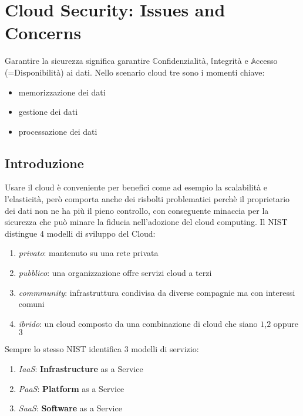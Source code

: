
\chapter{Cloud Security: Issues and Concerns}

Garantire la sicurezza significa garantire $\mathbb{C}$onfidenzialità, $\mathbb{I}$ntegrità e $\mathbb{A}$ccesso (=Disponibilità) ai dati. Nello scenario cloud tre sono i momenti chiave:
\begin{itemize}
    \item memorizzazione dei dati
    \item gestione dei dati
    \item processazione dei dati
\end{itemize}
\section{Introduzione}
Usare il cloud è conveniente per benefici come ad esempio la scalabilità e l'elasticità, però comporta anche dei risbolti problematici perchè il proprietario dei dati non ne ha più il pieno controllo, con conseguente minaccia per la sicurezza che può minare la fiducia nell'adozione del cloud computing. Il NIST distingue 4 modelli di sviluppo del Cloud:
\begin{enumerate}
    \item \textit{privato}: mantenuto su una rete privata
    \item \textit{pubblico}: una organizzazione offre servizi cloud a terzi
    \item \textit{commmunity}: infrastruttura condivisa da diverse compagnie ma con interessi comuni
    \item \textit{ibrido}: un cloud composto da una combinazione di cloud che siano $1$,$2$ oppure $3$
\end{enumerate}
Sempre lo stesso NIST identifica 3 modelli di servizio:
\begin{enumerate}
    \item \textit{IaaS}: \textbf{Infrastructure} as a Service
    \item \textit{PaaS}: \textbf{Platform} as a Service
    \item \textit{SaaS}: \textbf{Software} as a Service
\end{enumerate}
